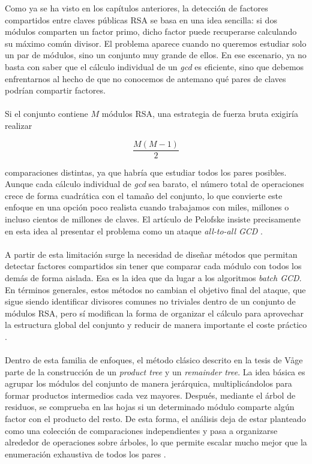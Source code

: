 Como ya se ha visto en los capítulos anteriores, la detección de factores compartidos entre claves públicas RSA se basa en una idea sencilla: si dos módulos comparten un factor primo, dicho factor puede recuperarse calculando su máximo común divisor. El problema aparece cuando no queremos estudiar solo un par de módulos, sino un conjunto muy grande de ellos. En ese escenario, ya no basta con saber que el cálculo individual de un \textit{gcd} es eficiente, sino que debemos enfrentarnos al hecho de que no conocemos de antemano qué pares de claves podrían compartir factores.
\\
\\
Si el conjunto contiene \(M\) módulos RSA, una estrategia de fuerza bruta exigiría realizar

\[
\frac{M(M-1)}{2}
\]

comparaciones distintas, ya que habría que estudiar todos los pares posibles. Aunque cada cálculo individual de \textit{gcd} sea barato, el número total de operaciones crece de forma cuadrática con el tamaño del conjunto, lo que convierte este enfoque en una opción poco realista cuando trabajamos con miles, millones o incluso cientos de millones de claves. El artículo de Pelofske insiste precisamente en esta idea al presentar el problema como un ataque \textit{all-to-all GCD} \cite{pelofske2024efficient}.
\\
\\
A partir de esta limitación surge la necesidad de diseñar métodos que permitan detectar factores compartidos sin tener que comparar cada módulo con todos los demás de forma aislada. Esa es la idea que da lugar a los algoritmos \textit{batch GCD}. En términos generales, estos métodos no cambian el objetivo final del ataque, que sigue siendo identificar divisores comunes no triviales dentro de un conjunto de módulos RSA, pero sí modifican la forma de organizar el cálculo para aprovechar la estructura global del conjunto y reducir de manera importante el coste práctico \cite{pelofske2024efficient,vage2022finding}.
\\
\\
Dentro de esta familia de enfoques, el método clásico descrito en la tesis de Våge parte de la construcción de un \textit{product tree} y un \textit{remainder tree}. La idea básica es agrupar los módulos del conjunto de manera jerárquica, multiplicándolos para formar productos intermedios cada vez mayores. Después, mediante el árbol de residuos, se comprueba en las hojas si un determinado módulo comparte algún factor con el producto del resto. De esta forma, el análisis deja de estar planteado como una colección de comparaciones independientes y pasa a organizarse alrededor de operaciones sobre árboles, lo que permite escalar mucho mejor que la enumeración exhaustiva de todos los pares \cite{vage2022finding,pelofske2024efficient}.
